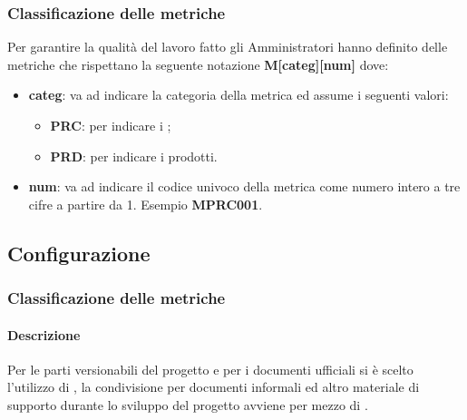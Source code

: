 \subsubsection{Classificazione delle metriche}
Per garantire la qualità del lavoro fatto gli Amministratori hanno definito delle metriche che rispettano la seguente notazione \textbf{M[categ][num]} dove:
\begin{itemize}
	\item \textbf{categ}: va ad indicare la categoria della metrica ed assume i seguenti valori:
	\begin{itemize}
		\item \textbf{PRC}: per indicare i ;
		\item \textbf{PRD}: per indicare i prodotti.
	\end{itemize} 
\end{itemize}
\begin{itemize}
	\item \textbf{num}: va ad indicare il codice univoco della metrica come numero intero a tre cifre a partire da 1. Esempio \textbf{MPRC001}.
\end{itemize}

\subsection{Configurazione}
\subsubsection{Classificazione delle metriche}
\paragraph{Descrizione}
Per le parti versionabili del progetto e per i documenti ufficiali si è scelto l’utilizzo di , la condivisione per documenti informali ed altro materiale di supporto durante lo sviluppo del progetto avviene per mezzo di .
